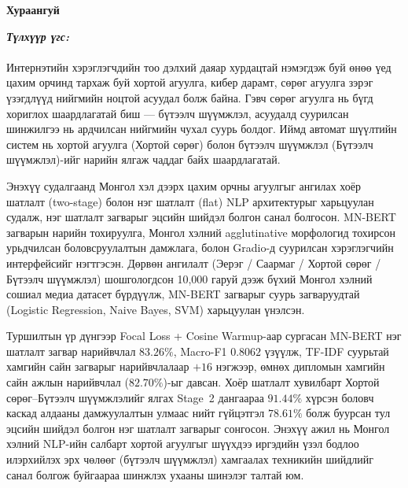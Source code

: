 ﻿%


\begin{center}
{\scshape\Large \univname\par} %
{\scshape\large \facname\par}\vspace{0.5cm} %
{\huge\textbf{{Хураангуй}} \par}
\bigskip
{\Large{\ttitle} \par} %
\bigskip

{\normalsize \shortname \par}\addressname


\end{center}

\textit{\textbf{Түлхүүр үгс: \keywordnames}}
\paragraph{}Интернэтийн хэрэглэгчдийн тоо дэлхий даяар хурдацтай нэмэгдэж буй өнөө үед цахим орчинд тархаж буй хортой агуулга, кибер дарамт, сөрөг агуулга зэрэг үзэгдлүүд нийгмийн ноцтой асуудал болж байна. Гэвч сөрөг агуулга нь бүгд хориглох шаардлагатай биш --- бүтээлч шүүмжлэл, асуудалд суурилсан шинжилгээ нь ардчилсан нийгмийн чухал суурь болдог. Иймд автомат шүүлтийн систем нь хортой агуулга (Хортой сөрөг) болон бүтээлч шүүмжлэл (Бүтээлч шүүмжлэл)-ийг нарийн ялгаж чаддаг байх шаардлагатай.

Энэхүү судалгаанд Монгол хэл дээрх цахим орчны агуулгыг ангилах хоёр шатлалт (two-stage) болон нэг шатлалт (flat) NLP архитектурыг харьцуулан судалж, нэг шатлалт загварыг эцсийн шийдэл болгон санал болгосон. MN-BERT загварын нарийн тохируулга, Монгол хэлний agglutinative морфологид тохирсон урьдчилсан боловсруулалтын дамжлага, болон Gradio-д суурилсан хэрэглэгчийн интерфейсийг нэгтгэсэн. Дөрвөн ангилалт (Эерэг / Саармаг / Хортой сөрөг / Бүтээлч шүүмжлэл) шошгологдсон 10,000 гаруй дээж бүхий Монгол хэлний сошиал медиа датасет бүрдүүлж, MN-BERT загварыг суурь загваруудтай (Logistic Regression, Naive Bayes, SVM) харьцуулан үнэлсэн.

Туршилтын үр дүнгээр Focal Loss + Cosine Warmup-аар сургасан MN-BERT нэг шатлалт загвар нарийвчлал $\mathbf{83.26\%}$, Macro-F1 $\mathbf{0.8062}$ үзүүлж, TF-IDF суурьтай хамгийн сайн загварыг нарийвчлалаар $+16$ нэгжээр, өмнөх дипломын хамгийн сайн ажлын нарийвчлал ($82.70\%$)-ыг давсан. Хоёр шатлалт хувилбарт Хортой сөрөг--Бүтээлч шүүмжлэлийг ялгах Stage~2 дангаараа $91.44\%$ хүрсэн боловч каскад алдааны дамжуулалтын улмаас нийт гүйцэтгэл $78.61\%$ болж буурсан тул эцсийн шийдэл болгон нэг шатлалт загварыг сонгосон. Энэхүү ажил нь Монгол хэлний NLP-ийн салбарт хортой агуулгыг шүүхдээ иргэдийн үзэл бодлоо илэрхийлэх эрх чөлөөг (бүтээлч шүүмжлэл) хамгаалах техникийн шийдлийг санал болгож буйгаараа шинжлэх ухааны шинэлэг талтай юм.
